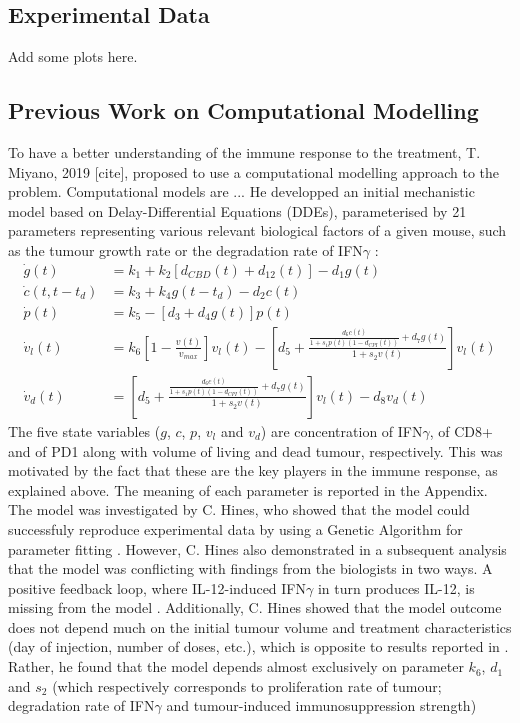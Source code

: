 \documentclass[11pt]{article}
\begin{document}
\subsection{Experimental Data}
Add some plots here.
\subsection{Previous Work on Computational Modelling}\label{ssec:prevWork}

To have a better understanding of the immune response to the treatment, T. Miyano, 2019 [cite], proposed to use a computational modelling approach to the problem. Computational models are ... He developped an initial mechanistic model based on Delay-Differential Equations (DDEs), parameterised by 21 parameters representing various relevant biological factors of a given mouse, such as the tumour growth rate or the degradation rate of IFN$\gamma$ \cite{takuya}: 
\begin{align*}
    \dot{g}(t) &= k_1 + k_2 [d_{CBD}(t) + d_{12}(t)] - d_1g(t) \\ 
    \dot{c}(t,t-t_d) &= k_3 + k_4g(t-t_d)-d_2c(t) \\ 
    \dot{p}(t) &= k_5 - [d_3 + d_4g(t)]p(t) \\ 
    \dot{v}_l(t) &= k_6\left[1 - \frac{v(t)}{v_{max}} \right]v_l(t) - \left[d_5 + \frac{\frac{d_6c(t)}{1+s_1p(t)(1-d_{CPI}(t))}+d_7g(t)}{1+s_2v(t)}\right]v_l(t)\\
    \dot{v}_d(t) &= \left[d_5 + \frac{\frac{d_6c(t)}{1+s_1p(t)(1-d_{CPI}(t))}+d_7g(t)}{1+s_2v(t)}\right]v_l(t) - d_8 v_d(t)
\end{align*}
The five state variables ($g$, $c$, $p$, $v_l$ and $v_d$) are concentration of IFN$\gamma$, of CD8+ and of PD1 along with volume of living and dead tumour, respectively. This was motivated by the fact that these are the key players in the immune response, as explained above. The meaning of each parameter is reported in the Appendix. The model was investigated by C. Hines, who showed that the model could successfuly reproduce experimental data by using a Genetic Algorithm for parameter fitting \cite{christian1}. However, C. Hines also demonstrated in a subsequent analysis that the model was conflicting with findings from the biologists in two ways. A positive feedback loop, where IL-12-induced IFN$\gamma$ in turn produces IL-12, is missing from the model \cite{christian2}. Additionally, C. Hines showed that the model outcome does not depend much on the initial tumour volume and treatment characteristics (day of injection, number of doses, etc.)\cite{christian1}, which is opposite to results reported in \cite{cbdil12}. Rather, he found that the model depends almost exclusively on parameter $k_6$, $d_1$ and $s_2$ (which respectively corresponds to proliferation rate of tumour; degradation rate of IFN$\gamma$ and tumour-induced immunosuppression strength)
\end{document}

